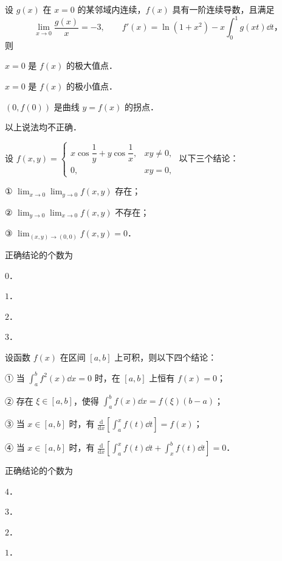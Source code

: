 
\begin{question}[index=1]
设 $g(x)$ 在 $x=0$ 的某邻域内连续，$f(x)$ 具有一阶连续导数，且满足
\[
\lim_{x\to0}\frac{g(x)}x=-3,\qquad f'(x)=\ln(1+x^2)-x\int_0^1 g(xt)\dd t\text{，}
\]
则
\begin{choices}[columns=2]
\item $x=0$ 是 $f(x)$ 的极大值点．
\item $x=0$ 是 $f(x)$ 的极小值点．
\item $(0,f(0))$ 是曲线 $y=f(x)$ 的拐点．
\item 以上说法均不正确．
\end{choices}
\end{question}
\QuestionBreak

\begin{question}[index=2]
设 $\displaystyle f(x,y)=\begin{cases}
x\cos\dfrac1y+y\cos\dfrac1x,&xy\ne0,\\[3pt]
0,&xy=0,
\end{cases}$
以下三个结论：\par
① $\displaystyle\lim_{x\to0}\lim_{y\to0} f(x,y)$ 存在；\par
② $\displaystyle\lim_{y\to0}\lim_{x\to0} f(x,y)$ 不存在；\par
③ $\displaystyle\lim_{(x,y)\to(0,0)} f(x,y)=0$．\par
正确结论的个数为
\begin{choices}[columns=4]
\item $0$．
\item $1$．
\item $2$．
\item $3$．
\end{choices}
\end{question}
\QuestionBreak

\begin{question}[index=3]
设函数 $f(x)$ 在区间 $[a,b]$ 上可积，则以下四个结论：\par
① 当 $\displaystyle\int_a^b f^2(x)\dd x=0$ 时，在 $[a,b]$ 上恒有 $f(x)=0$；\par
② 存在 $\xi\in[a,b]$，使得 $\displaystyle\int_a^b f(x)\dd x=f(\xi)(b-a)$；\par
③ 当 $x\in[a,b]$ 时，有 $\displaystyle\frac{\mathrm d}{\mathrm dx}\left[\int_a^x f(t)\dd t\right]=f(x)$；\par
④ 当 $x\in[a,b]$ 时，有 $\displaystyle\frac{\mathrm d}{\mathrm dx}
\left[\int_a^x f(t)\dd t+\int_x^b f(t)\dd t\right]=0$．\par
正确结论的个数为
\begin{choices}[columns=4]
\item $4$．
\item $3$．
\item $2$．
\item $1$．
\end{choices}
\end{question}
\QuestionBreak

